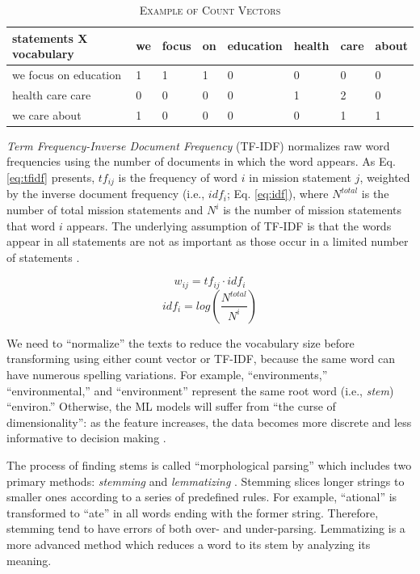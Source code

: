 \documentclass[11pt]{article}
\begin{document}
\begin{table}
\caption{\textsc{Example of Count Vectors}} \label{tab:count_vector}
\begin{tabular}{m{3.9cm}|m{0.9cm}|m{1cm}|m{0.9cm}|m{1.5cm}|m{1cm}|m{1cm}|m{0.8cm}}
    \hline
    statements X vocabulary & we & focus & on & education & health & care & about \\
    \hline
    we focus on education & 1 & 1 & 1 & 0 & 0 & 0 & 0 \\ 
    \hdashline
    health care care  & 0 & 0 & 0 & 0 & 1 & 2 & 0 \\ 
    \hdashline
    we care about & 1 & 0 & 0 & 0 & 0 & 1 & 1 \\ 
    \hline
\end{tabular}
\end{table}

\textit{Term Frequency-Inverse Document Frequency} (TF-IDF) normalizes raw word frequencies using the number of documents in which the word appears. As Eq. \ref{eq:tfidf} presents, $tf_{ij}$ is the frequency of word $i$ in mission statement $j$, weighted by the inverse document frequency (i.e., $idf_i$; Eq. \ref{eq:idf}), where $N^{total}$ is the number of total mission statements and $N^{i}$ is the number of mission statements that word $i$ appears. The underlying assumption of TF-IDF is that the words appear in all statements are not as important as those occur in a limited number of statements \parencite[278]{JurafskySpeechLanguageProcessing2017}.

\begin{equation} \label{eq:tfidf}
 w_{ij} = tf_{ij} \cdot idf_i 
\end{equation}
\begin{equation} \label{eq:idf}
idf_i = log(\frac{N^{total}}{N^{i}})
\end{equation}

We need to ``normalize'' the texts to reduce the vocabulary size before transforming using either count vector or TF-IDF, because the same word can have numerous spelling variations. For example, ``environments,'' ``environmental,'' and ``environment'' represent the same root word (i.e., \textit{stem}) ``environ.'' Otherwise, the ML models will suffer from ``the curse of dimensionality'': as the feature increases, the data becomes more discrete and less informative to decision making \parencite[94]{BellmanAdaptiveControlProcesses2015}. 

The process of finding stems is called ``morphological parsing'' which includes two primary methods: \textit{stemming} and \textit{lemmatizing} \parencite[25]{JurafskySpeechLanguageProcessing2017}. Stemming slices longer strings to smaller ones according to a series of predefined rules. For example, ``ational'' is transformed to ``ate'' in all words ending with the former string. Therefore, stemming tend to have errors of both over- and under-parsing. Lemmatizing is a more advanced method which reduces a word to its stem by analyzing its meaning.
\end{document}
